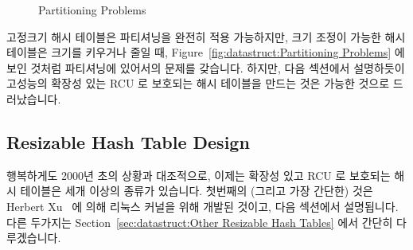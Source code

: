 \begin{figure}[tb]
\centering
{}
\caption{Partitioning Problems}
\end{figure}

고정크기 해시 테이블은 파티셔닝을 완전히 적용 가능하지만, 크기 조정이 가능한
해시 테이블은 크기를 키우거나 줄일 때,
Figure~\ref{fig:datastruct:Partitioning Problems} 에 보인 것처럼 파티셔닝에
있어서의 문제를 갖습니다.
하지만, 다음 섹션에서 설명하듯이 고성능의 확장성 있는 RCU 로 보호되는 해시
테이블을 만드는 것은 가능한 것으로 드러났습니다.

\subsection{Resizable Hash Table Design}
\label{sec:datastruct:Resizable Hash Table Design}

행복하게도 2000년 초의 상황과 대조적으로, 이제는 확장성 있고 RCU 로 보호되는
해시 테이블은 세개 이상의 종류가 있습니다.
첫번째의 (그리고 가장 간단한) 것은 Herbert Xu~\cite{HerbertXu2010RCUResizeHash}
에 의해 리눅스 커널을 위해 개발된 것이고, 다음 섹션에서 설명됩니다.
다른 두가지는
Section~\ref{sec:datastruct:Other Resizable Hash Tables} 에서
간단히 다루겠습니다.
\iffalse

